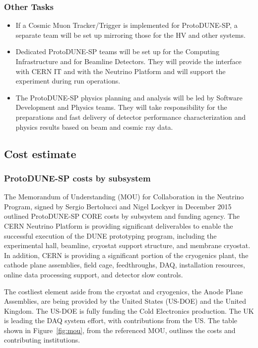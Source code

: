 \subsubsection{Other Tasks}

\begin{itemize}
\item If a Cosmic Muon Tracker/Trigger is implemented for ProtoDUNE-SP, a separate team will be set up mirroring those for the HV and other systems. 
\item Dedicated ProtoDUNE-SP teams will be set up for the Computing Infrastructure and for Beamline Detectors. They will provide the interface with CERN IT and with the Neutrino Platform and will support the experiment during run operations.
\item The ProtoDUNE-SP physics planning and analysis will be led by Software Development and Physics teams. They will take responsibility for the preparations and fast delivery of detector performance characterization and physics results based on beam and cosmic ray data.
\end{itemize}

\subsection{Cost estimate}

\subsubsection{ProtoDUNE-SP costs by subsystem}

The Memorandum of Understanding (MOU) for Collaboration in the Neutrino Program, signed by Sergio Bertolucci and Nigel Lockyer in December 2015 outlined ProtoDUNE-SP CORE costs by subsystem and funding agency.  The CERN Neutrino Platform is providing significant deliverables to enable the successful execution of the DUNE prototyping program, including the experimental hall, beamline, cryostat support structure, and membrane cryostat.  In addition, CERN is providing a significant portion of the cryogenics plant, the cathode plane assemblies, field cage, feedthroughs, DAQ, installation resources, online data processing support, and detector slow controls.  

The costliest element aside from the cryostat and cryogenics, the Anode Plane Assemblies, are being provided by the United States (US-DOE) and the United Kingdom.  The US-DOE is fully funding the Cold Electronics production.  The UK is leading the DAQ system effort, with contributions from the US.  The table shown in Figure~\ref{fig:mou}, from the referenced MOU, outlines the costs and contributing institutions.

